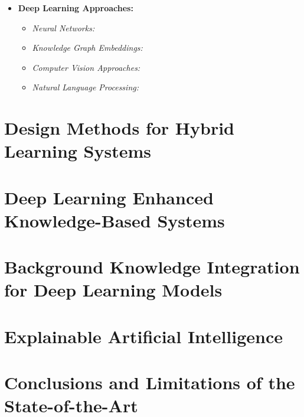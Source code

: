 \begin{itemize}
\begin{itemize}
    \end{itemize}
    \item \textbf{Deep Learning Approaches:}
    \begin{itemize}
        \item \textit{Neural Networks:}
        \item \textit{Knowledge Graph Embeddings:}
        \item \textit{Computer Vision Approaches:}
        \item \textit{Natural Language Processing:}
    \end{itemize}

\end{itemize}



\section{Design Methods for Hybrid Learning Systems}



\section{Deep Learning Enhanced Knowledge-Based Systems}

\section{Background Knowledge Integration for Deep Learning Models}

\section{Explainable Artificial Intelligence}

\section{Conclusions and Limitations of the State-of-the-Art}
